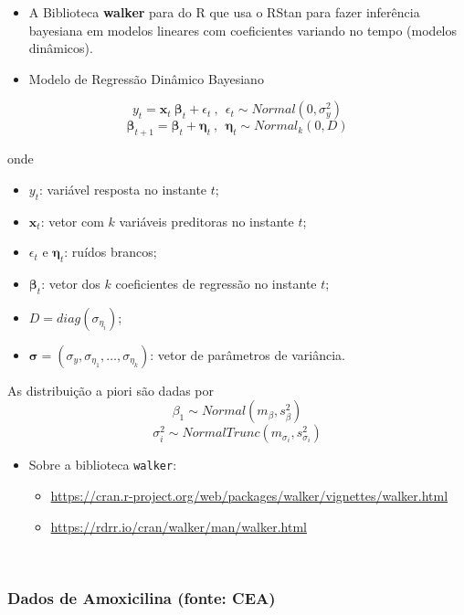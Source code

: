\documentclass[
]{book}
\providecommand{\tightlist}{%
  \setlength{\itemsep}{0pt}\setlength{\parskip}{0pt}}
\begin{document}
\begin{itemize}
\item
  A Biblioteca \textbf{walker} para do R que usa o RStan para fazer inferência bayesiana em modelos lineares com coeficientes variando no tempo (modelos dinâmicos).
\item
  Modelo de Regressão Dinâmico Bayesiano
\end{itemize}

\[y_t = \boldsymbol x_t~\boldsymbol\beta_t + \epsilon_t ~,~~ \epsilon_t \sim \textit{Normal}(0,\sigma_y^2)\]
\[\boldsymbol\beta_{t+1} = \boldsymbol\beta_t + \boldsymbol\eta_t ~,~~ \boldsymbol\eta_t \sim \textit{Normal}_k(0,D)\]

onde

\begin{itemize}
\item
  \(y_t\): variável resposta no instante \(t\);
\item
  \(\boldsymbol x_t\): vetor com \(k\) variáveis preditoras no instante \(t\);
\item
  \(\epsilon_t\) e \(\boldsymbol\eta_t\): ruídos brancos;
\item
  \(\boldsymbol\beta_t\): vetor dos \(k\) coeficientes de regressão no instante \(t\);
\item
  \(D=\textit{diag}({\sigma}_{\eta_i})\);
\item
  \(\boldsymbol\sigma=\left(\sigma_y,{\sigma}_{\eta_1},\ldots,{\sigma}_{\eta_k}\right)\): vetor de parâmetros de variância.
\end{itemize}

As distribuição a piori são dadas por
\[\beta_1 \sim \textit{Normal}(m_\beta,{s}_\beta^2)\]
\[\sigma_i^2 \sim \textit{NormalTrunc}({m}_{\sigma_i},{s}_{\sigma_i}^2)\]

\begin{itemize}
\tightlist
\item
  Sobre a biblioteca \texttt{walker}:

  \begin{itemize}
  \tightlist
  \item
    \url{https://cran.r-project.org/web/packages/walker/vignettes/walker.html}
  \item
    \url{https://rdrr.io/cran/walker/man/walker.html}
  \end{itemize}
\end{itemize}

\(~\)

\hypertarget{dados-de-amoxicilina-fonte-cea}{%
\subsubsection{Dados de Amoxicilina (fonte: CEA)}\label{dados-de-amoxicilina-fonte-cea}}
\end{document}
